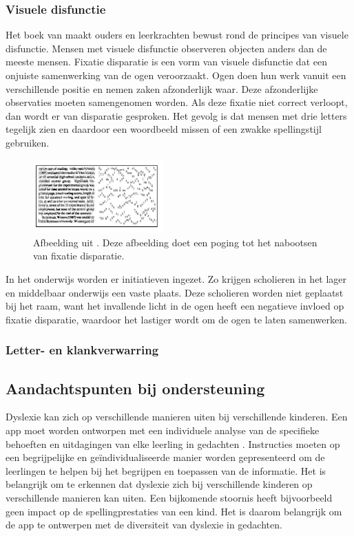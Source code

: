 \subsubsection{Visuele disfunctie}

Het boek van \textcite{Bezem2016} maakt ouders en leerkrachten bewust rond de principes van visuele disfunctie. Mensen met visuele disfunctie observeren objecten anders dan de meeste mensen. Fixatie disparatie is een vorm van visuele disfunctie dat een onjuiste samenwerking van de ogen veroorzaakt. Ogen doen hun werk vanuit een verschillende positie en nemen zaken afzonderlijk waar. Deze afzonderlijke observaties moeten samengenomen worden. Als deze fixatie niet correct verloopt, dan wordt er van disparatie gesproken. Het gevolg is dat mensen met drie letters tegelijk zien en daardoor een woordbeeld missen of een zwakke spellingstijl gebruiken.

\begin{figure}[H]
	\begin{center}
		\includegraphics[width=5cm]{img/visuele-disfunctie.png}
	\end{center}
	\caption{Afbeelding uit \textcite{Bezem2016}. Deze afbeelding doet een poging tot het nabootsen van fixatie disparatie. }
\end{figure}

In het onderwijs worden er initiatieven ingezet. Zo krijgen scholieren in het lager en middelbaar onderwijs een vaste plaats. Deze scholieren worden niet geplaatst bij het raam, want het invallende licht in de ogen heeft een negatieve invloed op fixatie disparatie, waardoor het lastiger wordt om de ogen te laten samenwerken. \autocite{Bezem2016}

\subsubsection{Letter- en klankverwarring}

\subsection{Aandachtspunten bij ondersteuning}

Dyslexie kan zich op verschillende manieren uiten bij verschillende kinderen. Een app moet worden ontworpen met een individuele analyse van de specifieke behoeften en uitdagingen van elke leerling in gedachten \autocite{Uhry2008, Gooding2018}. Instructies moeten op een begrijpelijke en geïndividualiseerde manier worden gepresenteerd om de leerlingen te helpen bij het begrijpen en toepassen van de informatie. Het is belangrijk om te erkennen dat dyslexie zich bij verschillende kinderen op verschillende manieren kan uiten. Een bijkomende stoornis heeft bijvoorbeeld geen impact op de spellingprestaties van een kind. Het is daarom belangrijk om de app te ontwerpen met de diversiteit van dyslexie in gedachten.

